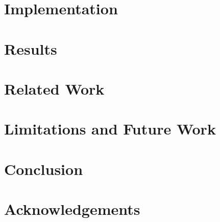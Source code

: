 \documentclass[conference]{IEEEtran}
\begin{document}
\section{Implementation}
\label{sec:implementation}


\section{Results}
\label{sec:results}


\section{Related Work}
\label{sec:relwork}



\section{Limitations and Future Work}
\label{sec:future}


\section{Conclusion}


\section{Acknowledgements}


\balance




\end{document}
